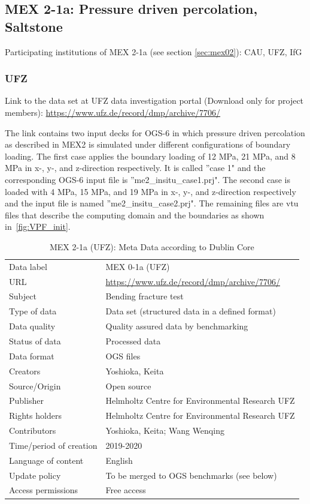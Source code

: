 \subsection{MEX 2-1a: Pressure driven percolation, Saltstone}

Participating institutions of MEX 2-1a (see section \ref{sec:mex02}): CAU, UFZ, IfG

\subsubsection*{UFZ}

Link to the data set at UFZ data investigation portal (Download only for project members):
\url{https://www.ufz.de/record/dmp/archive/7706/}

The link contains two input decks for OGS-6 in which pressure driven percolation as described in MEX2 is simulated under different configurations of boundary loading.
The first case applies the boundary loading of 12 MPa, 21 MPa, and 8 MPa in x-, y-, and z-direction respectively. It is called ''case 1" and the corresponding OGS-6 input file is ''me2\_insitu\_case1.prj".
The second case is loaded with 4 MPa, 15 MPa, and 19 MPa in x-, y-, and z-direction respectively and the input file is named ''me2\_insitu\_case2.prj".
The remaining files are vtu files that describe the computing domain and the boundaries as shown in~\ref{fig:VPF_init}.

\begin{table}[!ht]
\caption{MEX 2-1a (UFZ): Meta Data according to Dublin Core}
\label{tab:dms-mex2-1a-ufz}
\small
\begin{tabular}{R{3.5cm}|L{7.5cm}}
\hline
%
Data label & MEX 0-1a (UFZ) \\
URL & \url{https://www.ufz.de/record/dmp/archive/7706/} \\ 
Subject  & Bending fracture test \\
Type of data  & Data set (structured data in a defined format) \\
Data quality  & Quality assured data by benchmarking \\
Status of data  & Processed data \\
Data format  & OGS files \\
Creators  & Yoshioka, Keita  \\
Source/Origin & Open source \\
Publisher  & Helmholtz Centre for Environmental Research UFZ \\
Rights holders & Helmholtz Centre for Environmental Research UFZ \\
Contributors & Yoshioka, Keita; Wang Wenqing \\
Time/period of creation & 2019-2020 \\
Language of content & English \\
Update policy & To be merged to OGS benchmarks (see below) \\
Access permissions & Free access \\
%
\hline
\end{tabular}
\end{table}

